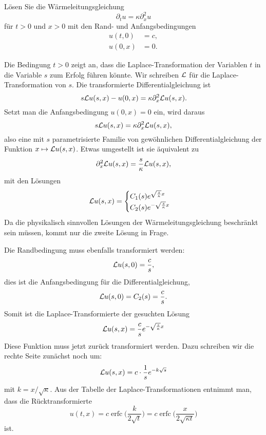 Lösen Sie die Wärmeleitungsgleichung
\[
\partial_t u=\kappa\partial_x^2u
\]
für $t>0$ und $x>0$ mit den Rand- und Anfangsbedingungen
\begin{align*}
u(t,0)&=c,\\
u(0,x)&=0.
\end{align*}

\begin{loesung}
Die Bedingung $t>0$ zeigt an, dass die Laplace-Transformation
der Variablen $t$ in die Variable $s$ zum Erfolg führen könnte.
Wir schreiben $\cal L$ für die Laplace-Transformation von $s$.
Die transformierte Differentialgleichung ist
\[
s{\cal L}u(s, x)-u(0,x)=\kappa \partial_x^2{\cal L}u(s,x).
\]
Setzt man die Anfangsbedingung $u(0,x)=0$ ein, wird daraus
\[
s{\cal L}u(s, x)=\kappa \partial_x^2{\cal L}u(s,x),
\]
also eine mit $s$ parametrisierte Familie von gewöhnlichen
Differentialgleichung der Funktion $x\mapsto {\cal L}u(s,x)$.
Etwas umgestellt ist sie äquivalent zu
\[
\partial_x^2{\cal L}u(s,x)
=
\frac{s}{\kappa}{\cal L}u(s, x),
\]
mit den Lösungen
\[
{\cal L}u(s,x)=\begin{cases}
C_1(s)e^{\sqrt{\frac{s}{\kappa}}x}\\
C_2(s)e^{-\sqrt{\frac{s}{\kappa}}x}
\end{cases}
\]
Da die physikalisch sinnvollen Lösungen der Wärmeleitungsgleichung
beschränkt sein müssen, kommt nur die zweite Lösung in Frage.

Die Randbedingung muss ebenfalls transformiert werden:
\[
{\cal L}u(s,0)=\frac{c}{s},
\]
dies ist die Anfangsbedingung für die Differentialgleichung,
\[
{\cal L}u(s,0)=C_2(s)=\frac{c}{s}.
\]
Somit ist die Laplace-Transformierte der gesuchten Lösung
\[
{\cal L}u(s,x)=\frac{c}{s}e^{-\sqrt{\frac{s}{\kappa}}x}
\]
Diese Funktion muss jetzt zurück transformiert werden.
Dazu schreiben wir die rechte Seite zunächst noch um:
\[
{\cal L}u(s,x)=c\cdot \frac{1}{s}e^{-k\sqrt{s}}
\]
mit $k=x/\sqrt{\kappa}$.
Aus der
Tabelle der Laplace-Transformationen entnimmt man, dass die
Rücktransformierte
\[
u(t,x)
=
c \operatorname{erfc}\biggl(
\frac{k}{2\sqrt{t}}
\biggr)
=
c \operatorname{erfc}\biggl(
\frac{x}{2\sqrt{\kappa t}}
\biggr)
\]
ist.
\end{loesung}
